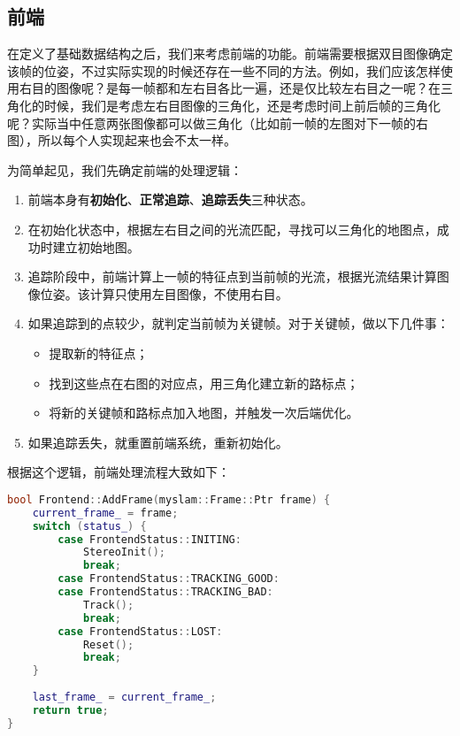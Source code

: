\subsection{前端}
在定义了基础数据结构之后，我们来考虑前端的功能。前端需要根据双目图像确定该帧的位姿，不过实际实现的时候还存在一些不同的方法。例如，我们应该怎样使用右目的图像呢？是每一帧都和左右目各比一遍，还是仅比较左右目之一呢？在三角化的时候，我们是考虑左右目图像的三角化，还是考虑时间上前后帧的三角化呢？实际当中任意两张图像都可以做三角化（比如前一帧的左图对下一帧的右图），所以每个人实现起来也会不太一样。

为简单起见，我们先确定前端的处理逻辑：
\begin{enumerate}
\item 前端本身有\textbf{初始化}、\textbf{正常追踪}、\textbf{追踪丢失}三种状态。
\item 在初始化状态中，根据左右目之间的光流匹配，寻找可以三角化的地图点，成功时建立初始地图。
\item 追踪阶段中，前端计算上一帧的特征点到当前帧的光流，根据光流结果计算图像位姿。该计算只使用左目图像，不使用右目。
\item 如果追踪到的点较少，就判定当前帧为关键帧。对于关键帧，做以下几件事：
\begin{itemize}
\item 提取新的特征点；
\item 找到这些点在右图的对应点，用三角化建立新的路标点；
\item 将新的关键帧和路标点加入地图，并触发一次后端优化。
\end{itemize}
\item 如果追踪丢失，就重置前端系统，重新初始化。
\end{enumerate}

根据这个逻辑，前端处理流程大致如下：
\begin{lstlisting}[language=c++,caption=slambook2/ch13/src/frontend.cpp]
bool Frontend::AddFrame(myslam::Frame::Ptr frame) {
    current_frame_ = frame;
    switch (status_) {
        case FrontendStatus::INITING:
            StereoInit();
            break;
        case FrontendStatus::TRACKING_GOOD:
        case FrontendStatus::TRACKING_BAD:
            Track();
            break;
        case FrontendStatus::LOST:
            Reset();
            break;
    }
    
    last_frame_ = current_frame_;
    return true;
}
\end{lstlisting}

